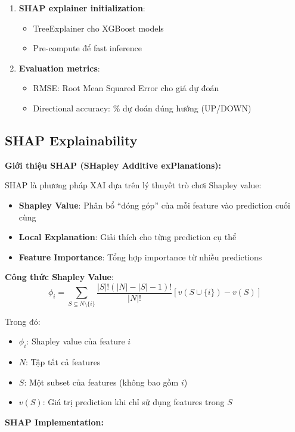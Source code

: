 \begin{enumerate}
    \item \textbf{SHAP explainer initialization}:
    \begin{itemize}
        \item TreeExplainer cho XGBoost models
        \item Pre-compute để fast inference
    \end{itemize}
    
    \item \textbf{Evaluation metrics}:
    \begin{itemize}
        \item RMSE: Root Mean Squared Error cho giá dự đoán
        \item Directional accuracy: \% dự đoán đúng hướng (UP/DOWN)
    \end{itemize}
\end{enumerate}

\subsection{SHAP Explainability}

\noindent\textbf{Giới thiệu SHAP (SHapley Additive exPlanations):}

SHAP là phương pháp XAI dựa trên lý thuyết trò chơi Shapley value:
\begin{itemize}
    \item \textbf{Shapley Value}: Phân bổ ``đóng góp'' của mỗi feature vào prediction cuối cùng
    \item \textbf{Local Explanation}: Giải thích cho từng prediction cụ thể
    \item \textbf{Feature Importance}: Tổng hợp importance từ nhiều predictions
\end{itemize}

\textbf{Công thức Shapley Value}:
$$\phi_i = \sum_{S \subseteq N \setminus \{i\}} \frac{|S|!(|N|-|S|-1)!}{|N|!} [v(S \cup \{i\}) - v(S)]$$

Trong đó:
\begin{itemize}
    \item $\phi_i$: Shapley value của feature $i$
    \item $N$: Tập tất cả features
    \item $S$: Một subset của features (không bao gồm $i$)
    \item $v(S)$: Giá trị prediction khi chỉ sử dụng features trong $S$
\end{itemize}

\noindent\textbf{SHAP Implementation:}

